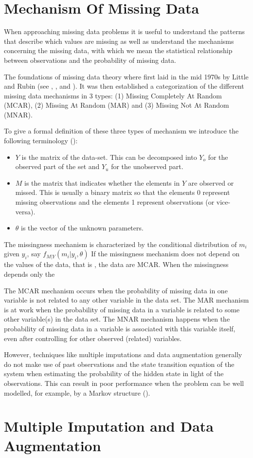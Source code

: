 \section{Mechanism Of Missing Data} \label{sec:mechanism}

When approaching missing data problems it is useful to understand the patterns that describe which values are missing as well as understand the mechanisms concerning the missing data, with which we mean the statistical relationship between observations and the probability of missing data.

The foundations of missing data theory where first laid in the mid 1970s by Little and Rubin (see \cite{Rubin76}, \cite{Little89}, and \cite{Little}). It was then established a categorization of the different missing data mechanisms in 3 types: (1) Missing Completely At Random (MCAR), (2) Missing At Random (MAR) and (3) Missing Not At Random (MNAR).

To give a formal definition of these three types of mechanism we introduce the following terminology (\cite{Little}):

\begin{itemize}
    \item $Y$ is the matrix of the data-set. This can be decomposed into $Y_o$ for the observed part of the set and $Y_u$ for the unobserved part.
    \item $M$ is the matrix that indicates whether the elements in $Y$ are observed or missed. This is usually a binary matrix so that the elements 0 represent missing observations and the elements 1 represent observations (or vice-versa).
    \item $\theta$ is the vector of the unknown parameters.
\end{itemize}
The missingness mechanism is characterized by the conditional distribution of $m_i$ given $y_i$, say $f_{M|Y}(m_i|y_i, \theta)$
If the missingness mechanism does not depend on the values of the data, that is , the data are MCAR. When the missingness depends only the 



The MCAR mechanism occurs when the probability of missing data in one variable is not related to any other variable in the data set. The MAR mechanism is at work when the probability of missing data in a variable
is related to some other variable(s) in the data set. The MNAR mechanism happens when the probability of missing data in a variable
is associated with this variable itself, even after controlling for other observed (related) variables.


However, techniques like multiple imputations and data augmentation generally do not make use of past observations and the state transition equation of the system when estimating the probability of the hidden state in light of the observations. This can result in poor performance when the problem can be well modelled, for example, by a Markov structure (\cite{Zhang}).

\section{Multiple Imputation and Data Augmentation} \label{sec:MIDA}



